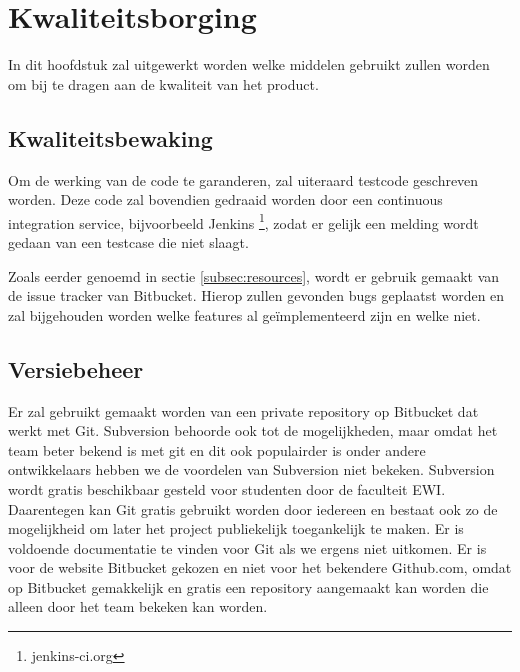 \section{Kwaliteitsborging}
In dit hoofdstuk zal uitgewerkt worden welke middelen gebruikt zullen worden om bij te dragen aan de kwaliteit van het product.

\subsection{Kwaliteitsbewaking}
Om de werking van de code te garanderen, zal uiteraard testcode geschreven worden. Deze code zal bovendien gedraaid worden door een continuous integration service, bijvoorbeeld Jenkins \footnote{jenkins-ci.org}, zodat er gelijk een melding wordt gedaan van een testcase die niet slaagt.

Zoals eerder genoemd in sectie \ref{subsec:resources}, wordt er gebruik gemaakt van de issue tracker van Bitbucket. Hierop zullen gevonden bugs geplaatst worden en zal bijgehouden worden welke features al ge\"implementeerd zijn en welke niet.

\subsection{Versiebeheer}
Er zal gebruikt gemaakt worden van een private repository op Bitbucket dat werkt met Git. Subversion behoorde ook tot de mogelijkheden, maar omdat het team beter bekend is met git en dit ook populairder is onder andere ontwikkelaars hebben we de voordelen van Subversion niet bekeken. Subversion wordt gratis beschikbaar gesteld voor studenten door de faculteit EWI. Daarentegen kan Git gratis gebruikt worden door iedereen en bestaat ook zo de mogelijkheid om later het project publiekelijk toegankelijk te maken. Er is voldoende documentatie te vinden voor Git als we ergens niet uitkomen. Er is voor de website Bitbucket gekozen en niet voor het bekendere Github.com, omdat op Bitbucket gemakkelijk en gratis een repository aangemaakt kan worden die alleen door het team bekeken kan worden. 
